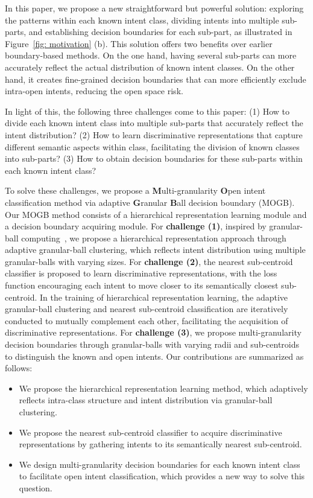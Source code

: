 \documentclass[letterpaper]{article} %
\theoremstyle{definition}
\begin{document}
In this paper, we propose a new straightforward but powerful solution: exploring the patterns within each known intent class, dividing intents into multiple sub-parts, and establishing decision boundaries for each sub-part, as illustrated in Figure~\ref{fig: motivation} (b). 
This solution offers two benefits over earlier boundary-based methods.
On the one hand, having several sub-parts can more accurately reflect the actual distribution of known intent classes. On the other hand, it creates fine-grained decision boundaries that can more efficiently exclude intra-open intents, reducing the open space risk.

In light of this, the following three challenges come to this paper: (1) How to divide each known intent class into multiple sub-parts that accurately reflect the intent distribution? 
(2) How to learn discriminative representations that capture different semantic aspects within class, facilitating the division of known classes into sub-parts?
(3) How to obtain decision boundaries for these sub-parts within each known intent class?

To solve these challenges, we propose a \textbf{M}ulti-granularity \textbf{O}pen intent classification method via adaptive \textbf{G}ranular \textbf{B}all decision boundary (MOGB). Our MOGB method consists of a hierarchical representation learning module and a decision boundary acquiring module.
For \textbf{challenge (1)}, inspired by granular-ball computing~\cite{xia2023gbrs}, we propose a hierarchical representation approach through adaptive granular-ball clustering, which reflects intent distribution using multiple granular-balls with varying sizes.
For \textbf{challenge (2)}, the nearest sub-centroid classifier is proposed to learn discriminative representations, with the loss function encouraging each intent to move closer to its semantically closest sub-centroid.
In the training of hierarchical representation learning, the adaptive granular-ball clustering and nearest sub-centroid classification are iteratively conducted to mutually complement each other, facilitating the acquisition of discriminative representations.
For \textbf{challenge (3)}, we propose multi-granularity decision boundaries through granular-balls with varying radii and sub-centroids to distinguish the known and open intents. 
Our contributions are summarized as follows:
\begin{itemize}
\item We propose the hierarchical representation learning method, which adaptively reflects intra-class structure and intent distribution via granular-ball clustering.

\item We propose the nearest sub-centroid classifier to acquire discriminative representations by gathering intents to its semantically nearest sub-centroid.

\item We design multi-granularity decision boundaries for each known intent class to facilitate open intent classification, which provides a new way to solve this question.
\end{itemize}
\end{document}
